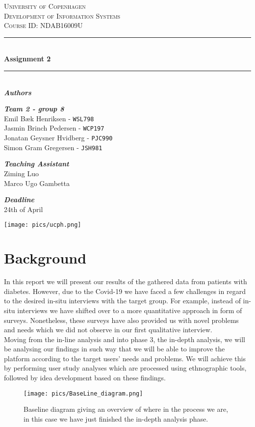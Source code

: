 \documentclass[a4paper,11pt]{article}
\begin{document}
\begin{titlepage}
    \newcommand{\HRule}{\rule{\linewidth}{0.5mm}}
    \center
    \textsc{\LARGE University of Copenhagen}\\[1.5cm]
    \textsc{\Large Development of Information Systems}\\[0.5cm]
    \textsc{Course ID: NDAB16009U}

    \vfill
    \HRule\\[0.4cm]
    {\huge\bfseries Assignment 2}\\[0.4cm]
    \HRule\\[1.5cm]

    \large\textit{\textbf{Authors}}
    
    \large\textit{\textbf{Team 2 -  group 8}}
    \\Emil Bæk Henriksen - \texttt{WSL798}
    \\Jasmin Brinch Pedersen - \texttt{WCP197}
    \\Jonatan Geysner Hvidberg - \texttt{PJC990}
    \\Simon Gram Gregersen - \texttt{JSH981}
    
    \vfill

    \large\textit{\textbf{Teaching Assistant}}
    \\Ziming Luo
    \\Marco Ugo Gambetta

    \vfill
    \large\textit{\textbf{Deadline}}
    \\24th of April
    \vfill

\texttt{[image: pics/ucph.png]}
\end{titlepage}


\newpage
\tableofcontents
\newpage
\section{Background}
In this report we will present our results of the gathered data from patients with diabetes. However, due to the Covid-19 we have faced a few challenges in regard to the desired in-situ interviews with the target group. For example, instead of in-situ interviews we have shifted over to a more quantitative approach in form of surveys. Nonetheless, these surveys have also provided us with novel problems and needs which we did not observe in our first qualitative interview.\\

Moving from the in-line analysis and into phase 3, the in-depth analysis, we will be analysing our findings in such way that we will be able to improve the platform according to the target users’ needs and problems. We will achieve this by performing user study analyses which are processed using ethnographic tools, followed by idea development based on these findings.
\begin{figure}[H]
    \centering
    \texttt{[image: pics/BaseLine\_diagram.png]}
    \caption{Baseline diagram giving an overview of where in the process we are, in this case we have just finished the in-depth analysis phase.}
    \label{fig:my_label}
\end{figure}
\end{document}

